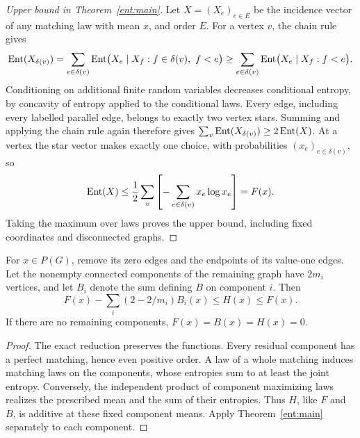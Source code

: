 \begin{proof}[Upper bound in Theorem~\ref{ent:main}]
Let $X=(X_e)_{e\in E}$ be the incidence vector of any matching law with
mean $x$, and order $E$. For a vertex $v$, the chain rule gives
\[
 \operatorname{Ent}(X_{\delta(v)})
 =\sum_{e\in\delta(v)}
   \operatorname{Ent}\bigl(X_e\mid X_f:f\in\delta(v),\ f<e\bigr)
 \ge\sum_{e\in\delta(v)}\operatorname{Ent}\bigl(X_e\mid X_f:f<e\bigr).
\]
Conditioning on additional finite random variables decreases conditional
entropy, by concavity of entropy applied to the conditional laws.
Every edge, including every labelled parallel edge, belongs to exactly
two vertex stars. Summing and applying the chain rule again therefore gives
$\sum_v\operatorname{Ent}(X_{\delta(v)})\ge2\operatorname{Ent}(X)$.
At a vertex the star vector makes exactly one choice, with probabilities
$(x_e)_{e\in\delta(v)}$, so
\[
 \operatorname{Ent}(X)\le\frac12\sum_v\left[-\sum_{e\in\delta(v)}x_e\log x_e\right]
 =F(x).
\]
Taking the maximum over laws proves the upper bound, including fixed
coordinates and disconnected graphs.
\end{proof}

\begin{corollary}\label{ent:components}
For $x\in P(G)$, remove its zero edges and the endpoints of its value-one
edges. Let the nonempty connected components of the remaining graph have
$2m_i$ vertices, and let $B_i$ denote the sum defining $B$ on component $i$.
Then
\[
                 F(x)-\sum_i(2-2/m_i)B_i(x)\le H(x)\le F(x).
\]
If there are no remaining components, $F(x)=B(x)=H(x)=0$.
\end{corollary}
\begin{proof}
The exact reduction preserves the functions. Every residual component
has a perfect matching, hence even positive order. A law of a whole
matching induces matching laws on the components, whose entropies sum
to at least the joint entropy. Conversely, the independent product of
component maximizing laws realizes the prescribed mean and the sum of
their entropies. Thus $H$, like $F$ and $B$, is additive at these fixed
component means. Apply Theorem~\ref{ent:main} separately to each component.
\end{proof}
